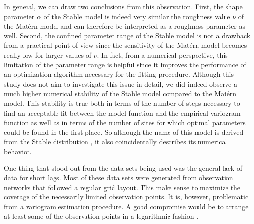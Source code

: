 \documentclass{article}
\begin{document}
In general, we can draw two conclusions from this observation. First, the shape parameter $\alpha$ of the Stable model is indeed very similar the roughness value $\nu$ of the Mat{\'e}rn model and can therefore be interpreted as a roughness parameter as well. Second, the confined parameter range of the Stable model is not a drawback from a practical point of view since the sensitivity of the Mat{\'e}rn model becomes really low for larger values of $\nu$. In fact, from a numerical perspective, this limitation of the parameter range is helpful since it improves the performance of an optimization algorithm necessary for the fitting procedure. Although this study does not aim to investigate this issue in detail, we did indeed observe a much higher numerical stability of the Stable model compared to the Mat{\'e}rn model. This stability is true both in terms of the number of steps necessary to find an acceptable fit between the model function and the empirical variogram function as well as in terms of the number of sites for which optimal parameters could be found in the first place. So although the name of this model is derived from the Stable distribution \citep{Wackernagel2003}, it also coincidentally describes its numerical behavior.

One thing that stood out from the data sets being used was the general lack of data for short lags. Most of these data sets were generated from observation networks that followed a regular grid layout. This make sense to maximize the coverage of the necessarily limited observation points. It is, however, problematic from a variogram estimation procedure. A good compromise would be to arrange at least some of the observation points in a logarithmic fashion \citep{Mueller2021}. 





\end{document}
